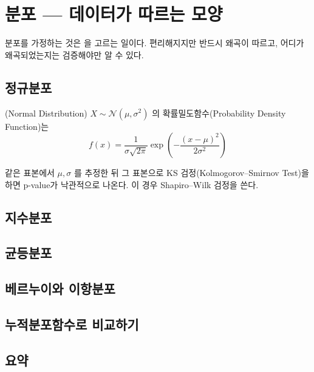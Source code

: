 \chapter{분포 --- 데이터가 따르는 모양}
\label{ch:distributions}

\begin{keyidea}
분포를 가정하는 것은 을 고르는 일이다. 편리해지지만 반드시
왜곡이 따르고, 어디가 왜곡되었는지는 검증해야만 알 수 있다.
\end{keyidea}

\section{정규분포}
\label{sec:normal}

\begin{inbrief}
  \item[Why] %
  \item[When] %
  \item[Where] %
  \item[How] %
\end{inbrief}

\begin{definition}[정규분포]
\label{def:normal}
(Normal Distribution) $X \sim \mathcal{N}(\mu, \sigma^2)$ 의
확률밀도함수(Probability Density Function)는
\[
  f(x) = \frac{1}{\sigma\sqrt{2\pi}}
         \exp\!\left(-\frac{(x-\mu)^2}{2\sigma^2}\right)
\]
\end{definition}


\begin{pitfall}
같은 표본에서 $\mu, \sigma$ 를 추정한 뒤 그 표본으로 KS 검정(Kolmogorov--Smirnov
Test)을 하면 p-value가 낙관적으로 나온다. 이 경우 Shapiro--Wilk 검정을 쓴다.
\end{pitfall}

\section{지수분포}
\label{sec:exponential}

\section{균등분포}
\label{sec:uniform}

\section{베르누이와 이항분포}
\label{sec:binomial}

\section{누적분포함수로 비교하기}
\label{sec:cdf}

\section{요약}
